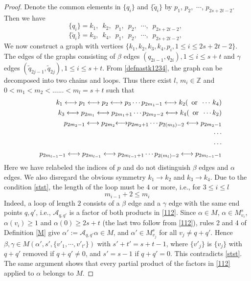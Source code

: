 \documentclass[11pt]{article}
\numberwithin{equation}{section}
\newcommand{\beq}{\begin{equation}}
\newcommand{\eeq}{\end{equation}}
\newcommand{\beqa}{\begin{eqnarray}}
\newcommand{\eeqa}{\end{eqnarray}}
\newcommand\Z{{\mathbb Z}}
\newcommand\rmor{ \,\,\,{\rm or}\,\,\, }
\newcommand\al{{\alpha}}
\newcommand\be{\beta}
\theoremstyle{definition}
\begin{document}
\begin{proof}
Denote the common elements in $\{q_i\}$ and $\{\widetilde q_i\}$ by  $p_1$, $p_2,$ $\cdots$, $p_{2s+2t-2}$. Then 
we have  \beq
 \{q_i\}=k_1,\,\,\,k_2,\,\,\,p_1,\,\,\,p_2,\,\,\,\cdots, \,\,\,p_{2s+2t-2},\,\,\,
 \eeq
 \beq
 \{\widetilde q_i\}=k_3,\,\,\,k_4,\,\,\,p_1,\,\,\,p_2,\,\,\,\cdots, \,\,\,p_{2s+2t-2},\,\,\,
 \eeq
We now construct a graph with vertices  $ \{ k_1, k_2, k_3, k_4, p_i, 1\le i \le 2s+2t -2 \} $.  The edges of the graphs consisting of 
$\beta$ edges $(q_{2i-1},q_{2i}), 1\le i \le s+t$ and $\gamma$ edges $(\widetilde q_{2j-1},\widetilde q_{2j}), 1\le i \le s+t$.  
{F}rom  \eqref{defnastk1234},  the graph can be decomposed into two chains and loops. Thus there exist
 $l$, $m_i\in \Z$ and $0<m_1<m_2<......<m_l=s+t$ such that 
%
\beqa\label{temp4.178}
&&k_1\longleftrightarrow p_1\longleftrightarrow p_2\longleftrightarrow p_3\cdots p_{2m_1-1}\longleftrightarrow k_2(\rmor\cdots\,k_4)\\\nonumber
&&k_3\longleftrightarrow p_{2m_1}\longleftrightarrow p_{2m_1+1}\cdots p_{2m_2-2}\longleftrightarrow k_4(\rmor\cdots k_2)
\\\nonumber
&&p_{2m_2-1}\longleftrightarrow p_{2m_2}{\longleftrightarrow}p_{2m_2+1}\cdots p_{2(m_3)-2}\longleftrightarrow p_{2m_2-1}
\\\nonumber
&&\cdots\\\nonumber
&&\cdots
\\\nonumber
&&p_{2m_{l-1}-1}\longleftrightarrow p_{2m_{l-1}}\longleftrightarrow p_{2m_{l-1}+1}\cdots p_{2(m_l)-2}\longleftrightarrow   p_{2m_{l-1}-1}
\eeqa
Here we have relabeled the indices of $p$ and do not distinguish $\beta$ edges and $\alpha$ edges. We also disregard the obvious 
symmetry $k_1 \to k_2$ and $k_3 \to k_4$.  
Due to the condition  \eqref{stst}, the length of the loop must be $4$ or more, i.e., for $3\leq i\leq l$
\beq
m_{i-1}+2\leq m_i
\eeq
Indeed, a loop of length $2$ consists of a $\be$ edge and a $\gamma$ edge with the same end points $q,q'$, i.e., $\mathcal A_{q,q'}$ is a factor of both products in \eqref{112}. Since $\al\in M$, $\al\in M^s_{v_i}$, $\al(v_i)\geq 1$ and $\al(0)\geq 2s+t$ (the last two follow from \eqref{112}), rules 2 and 4 of Definition \ref{M} give $\al':=\mathcal A_{q,q'}\al\in M$, and $\al'\in M^s_{v_j}$ for all $v_j\neq q+q'$. Hence $\be,\gamma\in M(\al',s',\{v'_1,\cdots,v'_{t'}\})$ with $s'+t'=s+t-1$, where $\{v'_j\}$ is $\{v_j\}$ with $q+q'$ removed if $q+q'\neq 0$, and $s'=s-1$ if $q+q'=0$. This contradicts \eqref{stst}. The same argument shows that every partial product of the factors in \eqref{112} applied to $\al$ belongs to $M$. 


\end{proof}
\end{document}
